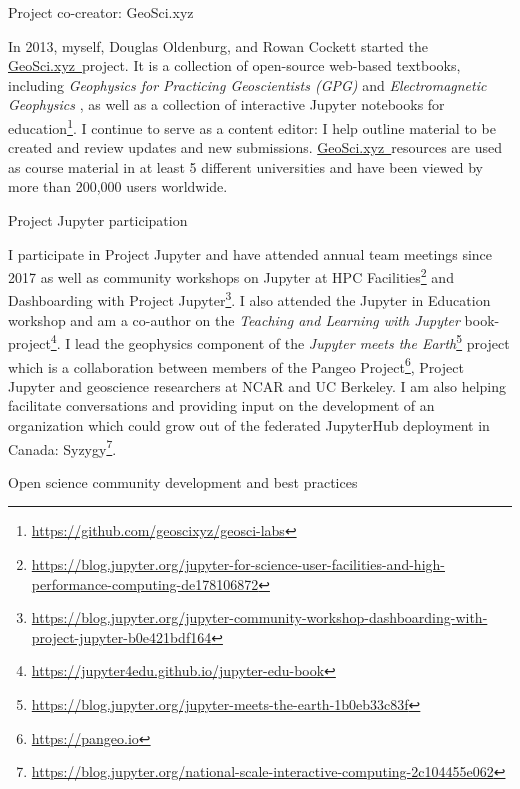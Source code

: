 \documentclass[a4paper, 11pt]{article}
\newcommand{\gpg}{\href{https://gpg.geosci.xyz}{https://gpg.geosci.xyz}}
\newcommand{\emgeosci}{\href{https://em.geosci.xyz}{https://em.geosci.xyz}}
\newcommand{\GeoSci}{\href{https://geosci.xyz}{GeoSci.xyz~}}
\newcommand{\subheading}[1]{
    \vspace{0.4cm}
    {\Large #1}\\
    \vspace{-0.2cm}
}
\begin{document}
\subheading{Project co-creator: GeoSci.xyz}

In 2013, myself, Douglas Oldenburg, and Rowan Cockett started the \GeoSci project. It is a collection of open-source web-based textbooks, including \emph{Geophysics for Practicing Geoscientists (GPG)}
and \emph{Electromagnetic Geophysics}
, as well as a collection of interactive Jupyter notebooks for education\footnote{\href{https://github.com/geoscixyz/geosci-labs}{https://github.com/geoscixyz/geosci-labs}}. I continue to serve as a content editor: I help outline material to be created and review updates and new submissions. \GeoSci resources are used as course material in at least 5 different universities and have been viewed by more than 200,000 users worldwide.

\subheading{Project Jupyter participation}

I participate in Project Jupyter and have attended annual team meetings since 2017 as well as community workshops on Jupyter at HPC Facilities\footnote{\href{https://blog.jupyter.org/jupyter-for-science-user-facilities-and-high-performance-computing-de178106872}{https://blog.jupyter.org/jupyter-for-science-user-facilities-and-high-performance-computing-de178106872}}
and Dashboarding with Project Jupyter\footnote{\href{https://blog.jupyter.org/jupyter-community-workshop-dashboarding-with-project-jupyter-b0e421bdf164}{https://blog.jupyter.org/jupyter-community-workshop-dashboarding-with-project-jupyter-b0e421bdf164}}.
I also attended the Jupyter in Education workshop and am a co-author on the \emph{Teaching and Learning with Jupyter} book-project\footnote{\href{https://jupyter4edu.github.io/jupyter-edu-book}{https://jupyter4edu.github.io/jupyter-edu-book}}. I lead the geophysics component of the \emph{Jupyter meets the Earth}\footnote{\href{https://blog.jupyter.org/jupyter-meets-the-earth-1b0eb33c83f}{https://blog.jupyter.org/jupyter-meets-the-earth-1b0eb33c83f}} project which is a collaboration between members of the Pangeo Project\footnote{\href{https://pangeo.io}{https://pangeo.io}}, Project Jupyter and geoscience researchers at NCAR and UC Berkeley. I am also helping facilitate conversations and providing input on the development of an organization which could grow out of the federated JupyterHub deployment in Canada: Syzygy\footnote{\href{https://blog.jupyter.org/national-scale-interactive-computing-2c104455e062}{https://blog.jupyter.org/national-scale-interactive-computing-2c104455e062}}.

\subheading{Open science community development and best practices}
\end{document}
